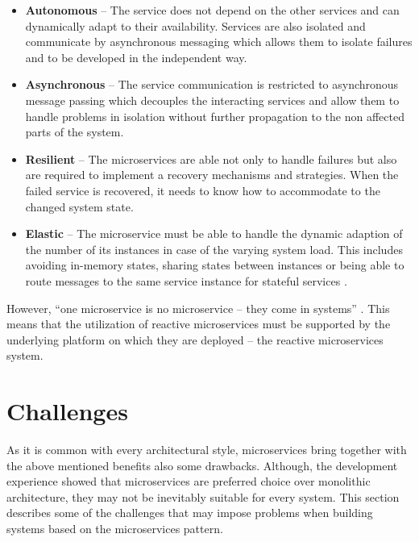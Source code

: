 \documentclass[oneside,
  digital, %
  table,   %
  lof,     %
  lot,     %
]{fithesis3}
\begin{document}
\begin{itemize}
    \item \textbf{Autonomous} -- The service does not depend on the other services and can dynamically adapt to their availability. Services are also isolated and communicate by asynchronous messaging which allows them to isolate failures and to be developed in the independent way.
    
    \item \textbf{Asynchronous} -- The service communication is restricted to asynchronous message passing which decouples the interacting services and allow them to handle problems in isolation without further propagation to the non affected parts of the system.
    
    \item \textbf{Resilient} -- The microservices are able not only to handle failures but also are required to implement a recovery mechanisms and strategies. When the failed service is recovered, it needs to know how to accommodate to the changed system state.
    
    \item \textbf{Elastic} -- The microservice must be able to handle the dynamic adaption of the number of its instances in case of the varying system load. This includes avoiding in-memory states, sharing states between instances or being able to route messages to the same service instance for stateful services \cite{building_reactive_ms_in_java}. 
\end{itemize}

However, \enquote{one microservice is no microservice -- they come in systems} \cite{reactive_ms_arch}. This means that the utilization of reactive microservices must be supported by the underlying platform on which they are deployed -- the reactive microservices system.

\section{Challenges}

As it is common with every architectural style, microservices bring together with the above mentioned benefits also some drawbacks. Although, the development experience showed that microservices are preferred choice over monolithic architecture, they may not be inevitably suitable for every system. This section describes some of the challenges that may impose problems when building systems based on the microservices pattern.
\end{document}
